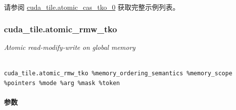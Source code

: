 \documentclass{article}
\begin{document}
请参阅 \href{https://docs.nvidia.com/cuda/tile-ir/latest/sections/appendix.html#example-cuda-tile-atomic-cas-tko-0}{cuda\_tile.atomic\_cas\_tko\_0} 获取完整示例列表。





\subsubsection{cuda\_tile.atomic\_rmw\_tko}


\textit{Atomic read-modify-write on global memory}




\begin{lstlisting}

cuda_tile.atomic_rmw_tko %memory_ordering_semantics %memory_scope %pointers %mode %arg %mask %token

\end{lstlisting}



\paragraph{参数}
\end{document}
